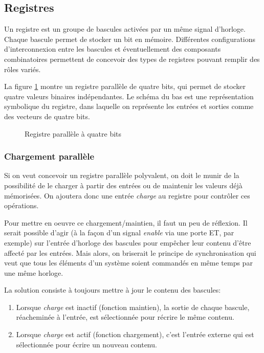 \documentclass[11pt]{article}
\begin{document}
\subsection{Registres}
\label{sec:org2178b9d}

Un registre est un groupe de bascules activées par un même signal
d'horloge. Chaque bascule permet de stocker un bit en
mémoire. Différentes configurations d'interconnexion entre les
bascules et éventuellement des composants combinatoires permettent de
concevoir des types de registres pouvant remplir des rôles variés.

La figure \ref{fig:org205d3c9} montre un registre parallèle de quatre bits,
qui permet de stocker quatre valeurs binaires indépendantes. Le schéma
du bas est une représentation symbolique du registre, dans laquelle on
représente les entrées et sorties comme des vecteurs de quatre bits.

\begin{figure}[htbp]
\centering

\caption{\label{fig:org205d3c9}Registre parallèle à quatre bits}
\end{figure}

\subsubsection{Chargement parallèle}
\label{sec:orge785664}

Si on veut concevoir un registre parallèle polyvalent, on doit le
munir de la possibilité de le charger à partir des entrées ou de
maintenir les valeurs déjà mémorisées. On ajoutera donc une entrée
\emph{charge} au registre pour contrôler ces opérations.

Pour mettre en oeuvre ce chargement/maintien, il faut un peu de
réflexion. Il serait possible d'agir (à la façon d'un signal \emph{enable}
via une porte ET, par exemple) sur l'entrée d'horloge des bascules pour
empêcher leur contenu d'être affecté par les entrées. Mais alors, on
briserait le principe de synchronisation qui veut que tous les
éléments d'un système soient commandés en même temps par une même
horloge.

La solution consiste à toujours mettre à jour le contenu des bascules: 

\begin{enumerate}
\item Lorsque \emph{charge} est inactif (fonction maintien), la sortie de
chaque bascule, réacheminée à l'entrée, est sélectionnée pour
récrire le même contenu.
\item Lorsque \emph{charge} est actif (fonction chargement), c'est l'entrée
externe qui est sélectionnée pour écrire un nouveau contenu.
\end{enumerate}
\end{document}
